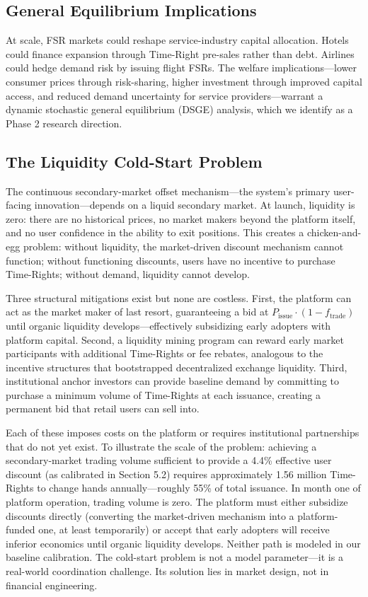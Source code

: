 \documentclass[12pt,a4paper]{article}
\begin{document}
\subsection{General Equilibrium Implications}

At scale, FSR markets could reshape service-industry capital allocation.
Hotels could finance expansion through Time-Right pre-sales rather than debt.
Airlines could hedge demand risk by issuing flight FSRs.
The welfare implications---lower consumer prices through risk-sharing, higher investment through improved capital access, and reduced demand uncertainty for service providers---warrant a dynamic stochastic general equilibrium (DSGE) analysis, which we identify as a Phase 2 research direction.

\subsection{The Liquidity Cold-Start Problem}

The continuous secondary-market offset mechanism---the system's primary user-facing innovation---depends on a liquid secondary market.
At launch, liquidity is zero: there are no historical prices, no market makers beyond the platform itself, and no user confidence in the ability to exit positions.
This creates a chicken-and-egg problem: without liquidity, the market-driven discount mechanism cannot function; without functioning discounts, users have no incentive to purchase Time-Rights; without demand, liquidity cannot develop.

Three structural mitigations exist but none are costless.
First, the platform can act as the market maker of last resort, guaranteeing a bid at $P_{\text{issue}} \cdot (1 - f_{\text{trade}})$ until organic liquidity develops---effectively subsidizing early adopters with platform capital.
Second, a liquidity mining program can reward early market participants with additional Time-Rights or fee rebates, analogous to the incentive structures that bootstrapped decentralized exchange liquidity.
Third, institutional anchor investors can provide baseline demand by committing to purchase a minimum volume of Time-Rights at each issuance, creating a permanent bid that retail users can sell into.

Each of these imposes costs on the platform or requires institutional partnerships that do not yet exist.
To illustrate the scale of the problem: achieving a secondary-market trading volume sufficient to provide a 4.4\% effective user discount (as calibrated in Section 5.2) requires approximately 1.56 million Time-Rights to change hands annually---roughly 55\% of total issuance.
In month one of platform operation, trading volume is zero.
The platform must either subsidize discounts directly (converting the market-driven mechanism into a platform-funded one, at least temporarily) or accept that early adopters will receive inferior economics until organic liquidity develops.
Neither path is modeled in our baseline calibration.
The cold-start problem is not a model parameter---it is a real-world coordination challenge. Its solution lies in market design, not in financial engineering.
\end{document}
